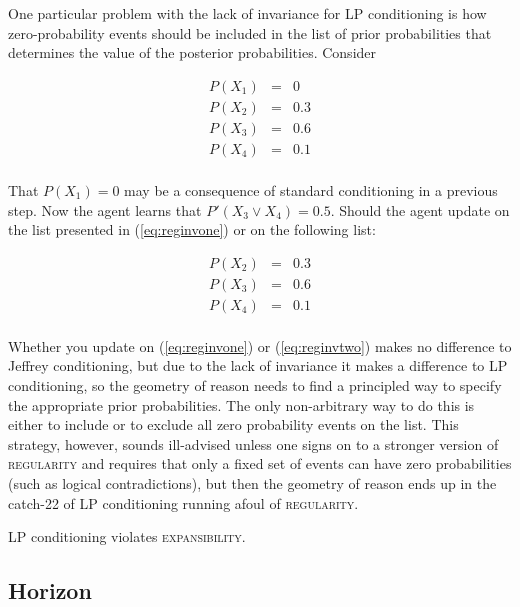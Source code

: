\documentclass[smallextended]{svjour3}       %
\begin{document}
One particular problem with the lack of invariance for LP conditioning
is how zero-probability events should be included in the list of prior
probabilities that determines the value of the posterior
probabilities. Consider

\begin{equation}
  \label{eq:reginvone}
  \begin{array}{rcl}
  P(X_{1})&=&0\\
  P(X_{2})&=&0.3\\
  P(X_{3})&=&0.6\\
  P(X_{4})&=&0.1\\
\end{array}
\end{equation}

That $P(X_{1})=0$ may be a consequence of standard conditioning in a
previous step. Now the agent learns that $P'(X_{3}\vee{}X_{4})=0.5$.
Should the agent update on the list presented in (\ref{eq:reginvone})
or on the following list:

\begin{equation}
  \label{eq:reginvtwo}
  \begin{array}{rcl}
  P(X_{2})&=&0.3\\
  P(X_{3})&=&0.6\\
  P(X_{4})&=&0.1\\
\end{array}
\end{equation}

Whether you update on (\ref{eq:reginvone}) or (\ref{eq:reginvtwo})
makes no difference to Jeffrey conditioning, but due to the lack of
invariance it makes a difference to LP conditioning, so the geometry
of reason needs to find a principled way to specify the appropriate
prior probabilities. The only non-arbitrary way to do this is either
to include or to exclude all zero probability events on the list. This
strategy, however, sounds ill-advised unless one signs on to a
stronger version of \textsc{regularity} and requires that only a fixed
set of events can have zero probabilities (such as logical
contradictions), but then the geometry of reason ends up in the
catch-22 of LP conditioning running afoul of \textsc{regularity}.

LP conditioning violates \textsc{expansibility}.

\subsection{Horizon}
\label{Horizon}
\end{document}
